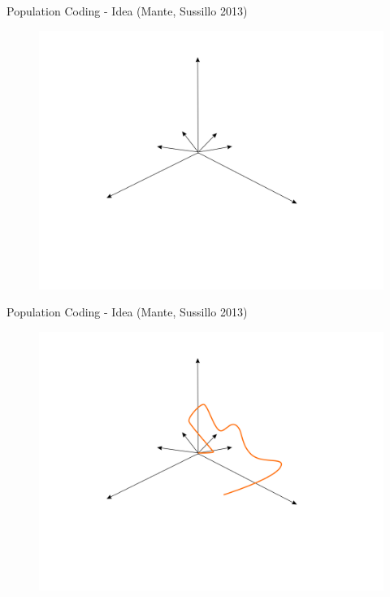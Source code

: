 \documentclass[10pt]{beamer}
\begin{document}
\begin{frame}[fragile]{Population Coding - Idea (Mante, Sussillo 2013)}
\begin{center}
	\begin{figure}
      \includegraphics[width=1.0\textwidth]{coord.png}
	\end{figure}
	\end{center}
\end{frame}

\begin{frame}[fragile]{Population Coding - Idea (Mante, Sussillo 2013)}
\begin{center}
	\begin{figure}
      \includegraphics[width=1.0\textwidth]{traj.png}
	\end{figure}
	\end{center}
\end{frame}
\end{document}
